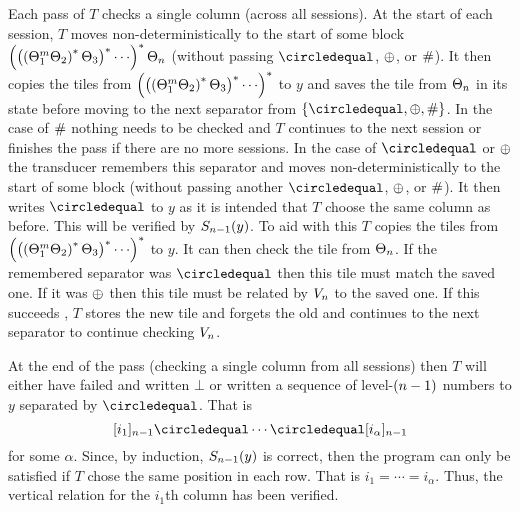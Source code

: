 \begin{itemize}
    Each pass of $T$ checks a single column (across all sessions).
    At the start of each session, $T$ moves non-deterministically to the start of some block
    $\brac{
        \brac{
            \brac{\tilesnum{1}^\linlen \tilesnum{2}}^\ast \tilesnum{3}
        }^\ast
        \cdots
    }^\ast
    \tilesnum{\expheight}$
    (without passing $\numeq$, $\oplus$, or $\#$).
    It then copies the tiles from
    $\brac{
        \brac{
            \brac{\tilesnum{1}^\linlen \tilesnum{2}}^\ast \tilesnum{3}
        }^\ast
        \cdots
    }^\ast$
    to $y$ and saves the tile from
    $\Theta_{n}$
    in its state before moving to the next separator from
    $\set{\numeq,\numplus,\numsep}$.
    In the case of $\#$ nothing needs to be checked and $T$ continues to the next session or finishes the pass if there are no more sessions.
    In the case of $\numeq$ or $\oplus$ the transducer remembers this separator and moves non-deterministically to the start of some block (without passing another $\numeq$, $\oplus$, or $\#$).
    It then writes $\numeq$ to $y$ as it is intended that $T$ choose the same column as before.
    This will be verified by
    ${S_{n-1}}\mathord{\left( y \right)}$.
    To aid with this $T$ copies the tiles from
    $\brac{
        \brac{
            \brac{\tilesnum{1}^\linlen \tilesnum{2}}^\ast \tilesnum{3}
        }^\ast
        \cdots
    }^\ast$
    to $y$.
    It can then check the tile from
    $\Theta_{n}$.
    If the remembered separator was $\numeq$ then this tile must match the saved one.
    If it was $\oplus$ then this tile must be related by
    $V_{n}$
    to the saved one.
    If this succeeds , $T$ stores the new tile and forgets the old and continues to the next separator to continue checking
    $V_{n}$.

    At the end of the pass (checking a single column from all sessions) then $T$ will either have failed and written $\bot$ or written a sequence of level-$(n-1)$ numbers to $y$ separated by $\numeq$.
    That is
    \[
        \tenc{\expheight-1}{i_1}
        \numeq
        \cdots
        \numeq
        \tenc{\expheight-1}{i_{\alpha}}
    \]
    for some $\alpha$.
    Since, by induction,
    ${S_{n-1}}\mathord{\left( y \right)}$
    is correct, then the program can only be satisfied if $T$ chose the same position in each row.
    That is
    $i_1 = \cdots = i_\alpha$.
    Thus, the vertical relation for the $i_1$th column has been verified.


\end{itemize}

